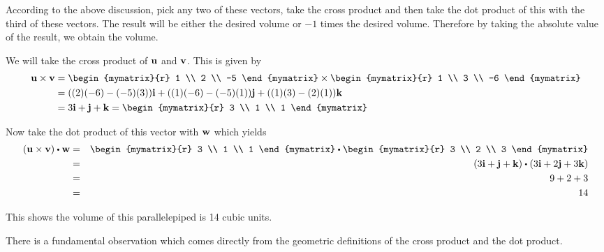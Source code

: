\begin{solution}
According to the above discussion, pick any two of these vectors, take the cross
product and then take the dot product of this with the third of these
vectors. The result will be either the desired volume or $-1$ times the desired
volume. Therefore by taking the absolute value of the result, we obtain the volume. 

We will take the cross product of ${\bf u}$ and ${\bf v}$. 
This is given by 
\begin{align*}
\vect{u} \times \vect{v}
&=
\begin{mymatrix}{r}
1 \\
2 \\
-5
\end{mymatrix}
\times
\begin{mymatrix}{r}
1 \\
3 \\
-6
\end{mymatrix}\\
&=((2)(-6)-(-5)(3))\vect{i}+((1)(-6)-(-5)(1))\vect{j}+((1)(3)-(2)(1))\vect{k} \\
&= 3\vect{i}+\vect{j}+\vect{k}
=
\begin{mymatrix}{r}
3 \\
1 \\
1
\end{mymatrix} 
\end{align*}

Now take the dot product of this vector with ${\bf w}$ which yields
\begin{eqnarray*}
(\vect{u} \times \vect{v}) \dotprod \vect{w}
&=&
\begin{mymatrix}{r}
3 \\
1 \\
1
\end{mymatrix}
\dotprod
\begin{mymatrix}{r}
3 \\
2 \\
3 
\end{mymatrix} \\
&=&\left( 3\vect{i}+\vect{j}+\vect{k}\right) \dotprod
 \left( 3\vect{i}+2\vect{j}+3\vect{k}\right) \\
&=&9+2+3 \\
&=&14
\end{eqnarray*}

This shows the volume of this parallelepiped is 14 cubic units.
\end{solution}

There is a fundamental observation which comes directly from the geometric
definitions of the cross product and the dot product.

